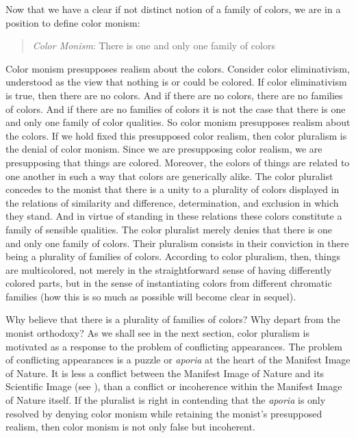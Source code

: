 \documentclass[12pt]{article}
\begin{document}
Now that we have a clear if not distinct notion of a family of colors, we are in a position to define color monism:
\begin{quote}
	\emph{Color Monism}: There is one and only one family of colors
\end{quote}
Color monism presupposes realism about the colors. Consider color eliminativism, understood as the view that nothing is or could be colored. If color eliminativism is true, then there are no colors. And if there are no colors, there are no families of colors. And if there are no families of colors it is not the case that there is one and only one family of color qualities. So color monism presupposes realism about the colors. If we hold fixed this presupposed color realism, then color pluralism is the denial of color monism. Since we are presupposing color realism, we are presupposing that things are colored. Moreover, the colors of things are related to one another in such a way that colors are generically alike. The color pluralist concedes to the monist that there is a unity to a plurality of colors displayed in the relations of similarity and difference, determination, and exclusion in which they stand. And in virtue of standing in these relations these colors constitute a family of sensible qualities. The color pluralist merely denies that there is one and only one family of colors. Their pluralism consists in their conviction in there being a plurality of families of colors. According to color pluralism, then, things are multicolored, not merely in the straightforward sense of having differently colored parts, but in the sense of instantiating colors from different chromatic families (how this is so much as possible will become clear in sequel).

Why believe that there is a plurality of families of colors? Why depart from the monist orthodoxy? As we shall see in the next section, color pluralism is motivated as a response to the problem of conflicting appearances. The problem of conflicting appearances is a puzzle or \emph{aporia} at the heart of the Manifest Image of Nature. It is less a conflict between the Manifest Image of Nature and its Scientific Image (see \citealt{Sellars:1963eo}), than a conflict or incoherence within the Manifest Image of Nature itself. If the pluralist is right in contending that the \emph{aporia} is only resolved by denying color monism while retaining the monist's presupposed realism, then color monism is not only false but incoherent.

\end{document}
